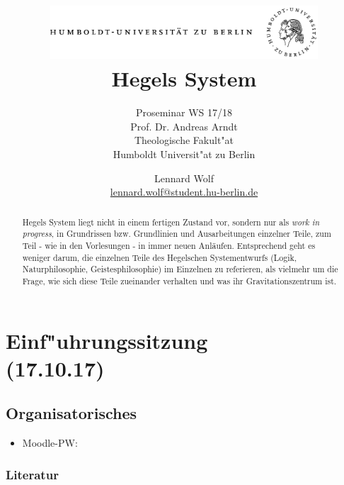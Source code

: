 \documentclass[emulatestandardclasses]{scrartcl}
\date{\vspace{-3ex}}
\begin{document}
\title{
	\includegraphics*[width=0.75\textwidth]{ErstesSem/images/hu_logo.png}\\
	\vspace{24pt}
	Hegels System}
\subtitle{Proseminar WS 17/18\\
          Prof. Dr. Andreas Arndt\\
          Theologische Fakult"at \\ 
          Humboldt Universit"at zu Berlin}
\author{Lennard Wolf\\
        \small{\href{mailto:lennard.wolf@student.hu-berlin.de}{lennard.wolf@student.hu-berlin.de}}}
\maketitle
\begin{abstract}
Hegels System liegt nicht in einem fertigen Zustand vor, sondern nur als \emph{work in progress}, in Grundrissen bzw. Grundlinien und Ausarbeitungen einzelner Teile, zum Teil - wie in den Vorlesungen - in immer neuen Anläufen. Entsprechend geht es weniger darum, die einzelnen Teile des Hegelschen Systementwurfs (Logik, Naturphilosophie, Geistesphilosophie) im Einzelnen zu referieren, als vielmehr um die Frage, wie sich diese Teile zueinander verhalten und was ihr Gravitationszentrum ist.

\end{abstract}
\newpage

\tableofcontents
\listoffigures
\newpage


\section{Einf"uhrungssitzung\\(17.10.17)}

\subsection{Organisatorisches}

\begin{itemize}
  \item Moodle-PW: 
\end{itemize}

\subsubsection{Literatur}
\end{document}
